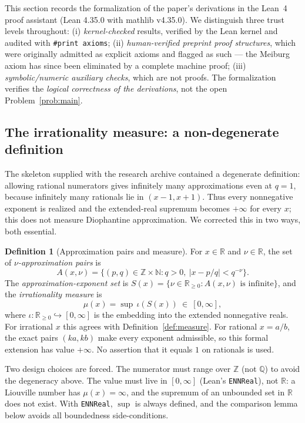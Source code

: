 \documentclass[11pt]{amsart}
\theoremstyle{definition}
\newtheorem{definition}[theorem]{Definition}
\theoremstyle{remark}
\numberwithin{equation}{section}
\newcommand{\Q}{\mathbb{Q}}
\newcommand{\R}{\mathbb{R}}
\newcommand{\Z}{\mathbb{Z}}
\newcommand{\N}{\mathbb{N}}
\newcommand{\irr}{\mu}
\begin{document}
This section records the formalization of the paper's derivations in the Lean~4 proof assistant (Lean 4.35.0 with mathlib v4.35.0). We distinguish three trust levels throughout: (i) \emph{kernel-checked} results, verified by the Lean kernel and audited with \texttt{\#print axioms}; (ii) \emph{human-verified preprint proof structures}, which were originally admitted as explicit axioms and flagged as such --- the Meiburg axiom has since been eliminated by a complete machine proof; (iii) \emph{symbolic/numeric auxiliary checks}, which are not proofs. The formalization verifies the \emph{logical correctness of the derivations}, not the open Problem~\ref{prob:main}.

\subsection{The irrationality measure: a non-degenerate definition}\label{sec:lean-def}

The skeleton supplied with the research archive contained a degenerate definition: allowing rational numerators gives infinitely many approximations even at $q=1$, because infinitely many rationals lie in $(x-1,x+1)$. Thus every nonnegative exponent is realized and the extended-real supremum becomes $+\infty$ for every $x$; this does not measure Diophantine approximation. We corrected this in two ways, both essential.

\begin{definition}[Approximation pairs and measure]\label{def:lean-measure}
For $x\in\R$ and $\nu\in\R$, the set of \emph{$\nu$-approximation pairs} is
\[
A(x,\nu)=\{(p,q)\in\Z\times\N: q>0,\ |x-p/q|<q^{-\nu}\}.
\]
The \emph{approximation-exponent set} is $S(x)=\{\nu\in\R_{\ge0}: A(x,\nu)\text{ is infinite}\}$, and the \emph{irrationality measure} is
\[
\irr(x)=\sup\,\iota(S(x))\ \in\ [0,\infty],
\]
where $\iota:\R_{\ge0}\hookrightarrow[0,\infty]$ is the embedding into the extended nonnegative reals. For irrational $x$ this agrees with Definition~\ref{def:measure}. For rational $x=a/b$, the exact pairs $(ka,kb)$ make every exponent admissible, so this formal extension has value $+\infty$. No assertion that it equals $1$ on rationals is used.
\end{definition}

Two design choices are forced. The numerator must range over $\Z$ (not $\Q$) to avoid the degeneracy above. The value must live in $[0,\infty]$ (Lean's \texttt{ENNReal}), not $\R$: a Liouville number has $\irr(x)=\infty$, and the supremum of an unbounded set in $\R$ does not exist. With \texttt{ENNReal}, $\sup$ is always defined, and the comparison lemma below avoids all boundedness side-conditions.
\end{document}
